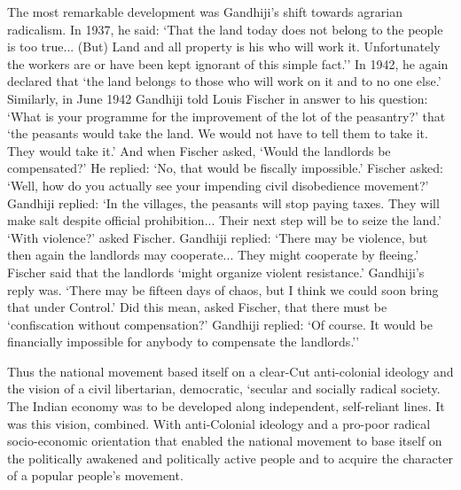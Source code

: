 The most remarkable development was Gandhiji's shift towards agrarian radicalism. In 1937, he said: `That the land today does not belong to the people is too true... (But) Land and all property is his who will work it. Unfortunately the workers are or have been kept ignorant of this simple fact.'' In 1942, he again declared that `the land belongs to those who will work on it and to no one else.' Similarly, in June 1942 Gandhiji told Louis Fischer in answer to his question: `What is your programme for the improvement of the lot of the peasantry?' that `the peasants would take the land. We would not have to tell them to take it. They would take it.' And when Fischer asked, `Would the landlords be compensated?' He replied: `No, that would be fiscally impossible.' Fischer asked: `Well, how do you actually see your impending civil disobedience movement?' Gandhiji replied: `In the villages, the peasants will stop paying taxes. They will make salt despite official prohibition... Their next step will be to seize the land.' `With violence?' asked Fischer. Gandhiji replied: `There may be violence, but then again the landlords may cooperate... They might cooperate by fleeing.' Fischer said that the landlords `might organize violent resistance.' Gandhiji's reply was. `There may be fifteen days of chaos, but I think we could soon bring that under Control.' Did this mean, asked Fischer, that there must be `confiscation without compensation?' Gandhiji replied: `Of course. It would be financially impossible for anybody to compensate the landlords.''

Thus the national movement based itself on a clear-Cut anti-colonial ideology and the vision of a civil libertarian, democratic, `secular and socially radical society. The Indian economy was to be developed along independent, self-reliant lines. It was this vision, combined. With anti-Colonial ideology and a pro-poor radical socio-economic orientation that enabled the national movement to base itself on the politically awakened and politically active people and to acquire the character of a popular people's movement.
